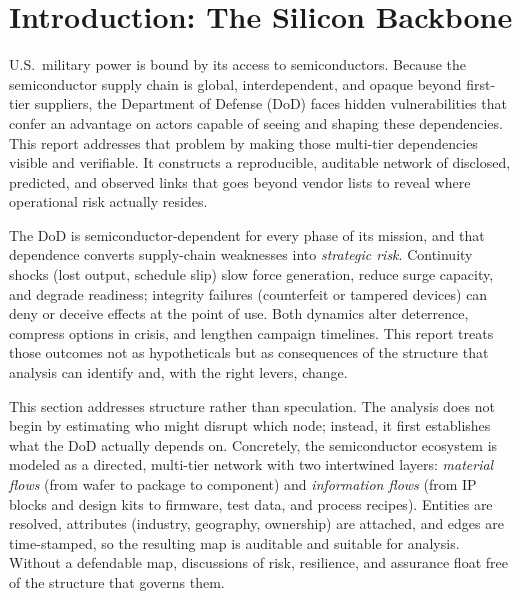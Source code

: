\chapter{Introduction: The Silicon Backbone}
\label{chap:intro}
U.S.\ military power is bound by its access to semiconductors. Because the semiconductor supply chain is global, interdependent, and opaque beyond first-tier suppliers, the Department of Defense (DoD) faces hidden vulnerabilities that confer an advantage on actors capable of seeing and shaping these dependencies. This report addresses that problem by making those multi-tier dependencies visible and verifiable. It constructs a reproducible, auditable network of disclosed, predicted, and observed links that goes beyond vendor lists to reveal where operational risk actually resides.

The DoD is semiconductor-dependent for every phase of its mission, and that dependence converts supply-chain weaknesses into \emph{strategic risk}. Continuity shocks (lost output, schedule slip) slow force generation, reduce surge capacity, and degrade readiness; integrity failures (counterfeit or tampered devices) can deny or deceive effects at the point of use. Both dynamics alter deterrence, compress options in crisis, and lengthen campaign timelines. This report treats those outcomes not as hypotheticals but as consequences of the structure that analysis can identify and, with the right levers, change.

This section addresses structure rather than speculation. The analysis does not begin by estimating who might disrupt which node; instead, it first establishes what the DoD actually depends on. Concretely, the semiconductor ecosystem is modeled as a directed, multi-tier network with two intertwined layers: \emph{material flows} (from wafer to package to component) and \emph{information flows} (from IP blocks and design kits to firmware, test data, and process recipes). Entities are resolved, attributes (industry, geography, ownership) are attached, and edges are time-stamped, so the resulting map is auditable and suitable for analysis. Without a defendable map, discussions of risk, resilience, and assurance float free of the structure that governs them.

